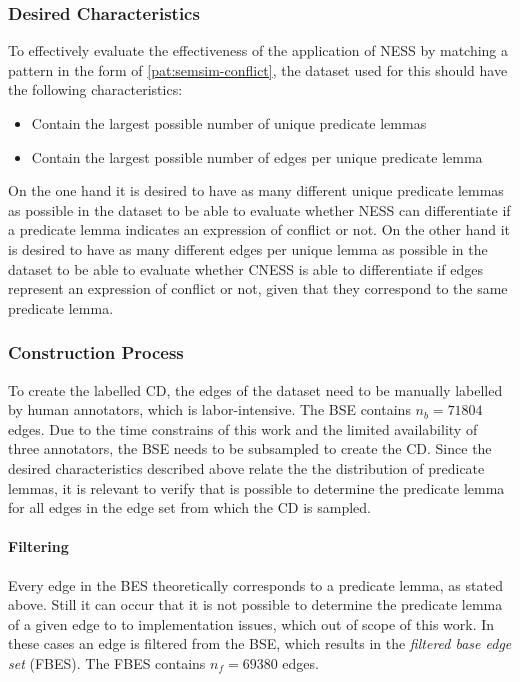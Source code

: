 \documentclass[11pt]{scrreprt}
\begin{document}
\subsubsection{Desired Characteristics}
\label{sec:dataset-characteristics}
To effectively evaluate the effectiveness of the application of NESS by matching a pattern in the form of \cref{pat:semsim-conflict}, the dataset used for this should have the following characteristics:

\begin{itemize}
	\item Contain the largest possible number of unique predicate lemmas
	\item Contain the largest possible number of edges per unique predicate lemma
\end{itemize}

On the one hand it is desired to have as many different unique predicate lemmas as possible in the dataset to be able to evaluate whether NESS can differentiate if a predicate lemma indicates an expression of conflict or not. On the other hand it is desired to have as many different edges per unique lemma as possible in the dataset to be able to evaluate whether CNESS is able to differentiate if edges represent an expression of conflict or not, given that they correspond to the same predicate lemma.

\subsubsection{Construction Process}
To create the labelled CD, the edges of the dataset need to be manually labelled by human annotators, which is labor-intensive. The BSE contains \(n_b=71804\) edges. Due to the time constrains of this work and the limited availability of three annotators, the BSE needs to be subsampled to create the CD. Since the desired characteristics described above relate the the distribution of predicate lemmas, it is relevant to verify that is possible to determine the predicate lemma for all edges in the edge set from which the CD is sampled.

\paragraph{Filtering}
Every edge in the BES theoretically corresponds to a predicate lemma, as stated above. Still it can occur that it is not possible to determine the predicate lemma of a given edge to to implementation issues, which out of scope of this work. In these cases an edge is filtered from the BSE, which results in the \textit{filtered base edge set} (FBES). The FBES contains \(n_{f} = 69 380\) edges. 
\end{document}
